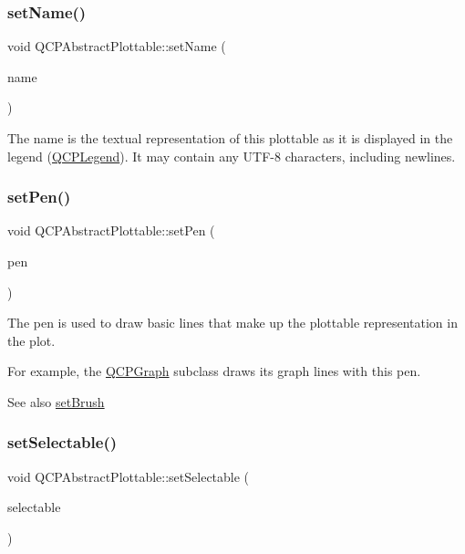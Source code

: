 \subsubsection{\texorpdfstring{set\+Name()}{setName()}}
{\footnotesize\ttfamily void Q\+C\+P\+Abstract\+Plottable\+::set\+Name (\begin{DoxyParamCaption}\item[{const Q\+String \&}]{name }\end{DoxyParamCaption})}

The name is the textual representation of this plottable as it is displayed in the legend (\mbox{\hyperlink{class_q_c_p_legend}{Q\+C\+P\+Legend}}). It may contain any U\+T\+F-\/8 characters, including newlines. \mbox{\label{class_q_c_p_abstract_plottable_ab74b09ae4c0e7e13142fe4b5bf46cac7}} 
\subsubsection{\texorpdfstring{set\+Pen()}{setPen()}}
{\footnotesize\ttfamily void Q\+C\+P\+Abstract\+Plottable\+::set\+Pen (\begin{DoxyParamCaption}\item[{const Q\+Pen \&}]{pen }\end{DoxyParamCaption})}

The pen is used to draw basic lines that make up the plottable representation in the plot.

For example, the \mbox{\hyperlink{class_q_c_p_graph}{Q\+C\+P\+Graph}} subclass draws its graph lines with this pen.

\begin{DoxySeeAlso}{See also}
\mbox{\hyperlink{class_q_c_p_abstract_plottable_a7a4b92144dca6453a1f0f210e27edc74}{set\+Brush}} 
\end{DoxySeeAlso}
\mbox{\label{class_q_c_p_abstract_plottable_ac238d6e910f976f1f30d41c2bca44ac3}} 
\subsubsection{\texorpdfstring{set\+Selectable()}{setSelectable()}}
{\footnotesize\ttfamily void Q\+C\+P\+Abstract\+Plottable\+::set\+Selectable (\begin{DoxyParamCaption}\item[{\mbox{\hyperlink{namespace_q_c_p_ac6cb9db26a564b27feda362a438db038}{Q\+C\+P\+::\+Selection\+Type}}}]{selectable }\end{DoxyParamCaption})}


